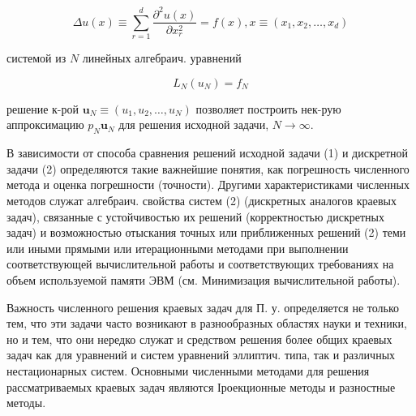 \documentclass[10pt]{article}
\begin{document}
\[

\Delta u(x) \equiv \sum_{r=1}^{d} \frac{\partial^{2} u(x)}{\partial x_{r}^{2}}=f(x), x \equiv\left(x_{1}, x_{2}, \ldots, x_{d}\right)

\]



системой из $N$ линейных алгебраич. уравнений



\[

L_{N}\left(u_{N}\right)=f_{N}

\]



решение к-рой $\boldsymbol{u}_{N} \equiv\left(u_{1}, u_{2}, \ldots, u_{N}\right)$ позволяет построить нек-рую аппроксимацию $p_{N} \boldsymbol{u}_{N}$ для решения исходной задачи, $N \rightarrow \infty$.



В зависимости от способа сравнения решений исходной задачи (1) и дискретной задачи (2) определяются такие важнейшие понятия, как погрешность численного метода и оценка погрешности (точности). Другими характеристиками численных методов служат алгебраич. свойства систем (2) (дискретных аналогов краевых задач), связанные с устойчивостью их решений (корректностью дискретных задач) и возможностью отыскания точных или приближенных решений (2) теми или иными прямыми или итерационными методами при выполнении соответствующей вычислительной работы и соответствующих требованиях на объем используемой памяти ЭВМ (см. Минимизация вычислительной работы).



Важность численного решения краевых задач для П. у. определяется не только тем, что эти задачи часто возникают в разнообразных областях науки и техники, но и тем, что они нередко служат и средством решения более общих краевых задач как для уравнений и систем уравнений эллиптич. типа, так и различных нестационарных систем. Основными численными методами для решения рассматриваемых краевых задач являются Іроекционные методы и разностные методы.
\end{document}
